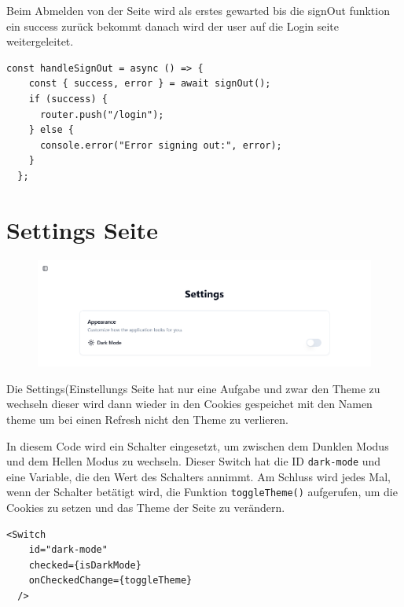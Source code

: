 \begin{inhalt}
\begin{enumerate}[label=\textbf{\arabic*.}]
Beim Abmelden von der Seite wird als erstes  gewarted bis die signOut funktion ein success zurück bekommt danach wird der user auf die Login seite weitergeleitet. 

\begin{lstlisting}[language=mytsx]
  const handleSignOut = async () => {
    const { success, error } = await signOut();
    if (success) {
      router.push("/login");
    } else {
      console.error("Error signing out:", error);
    }
  };
\end{lstlisting}


\newpage

\section{Settings Seite}

\begin{figure}[!htb]
\centering
\includegraphics[width=1\textwidth]{files/Thomas/pics/Website/Settings/settings-screen.png}
\caption[Bildbezeichnung für Abbildungsverzeichnis]{}
\label{fig:gehaeuse_internet_bild}
\end{figure}


Die Settings(Einstellungs Seite hat nur eine Aufgabe und zwar den Theme zu wechseln dieser wird dann wieder in den Cookies gespeichet mit den Namen theme um bei einen Refresh nicht den Theme zu verlieren.

\vspace{2cm}

In diesem Code wird ein Schalter eingesetzt, um zwischen dem Dunklen Modus und dem Hellen Modus zu wechseln. Dieser Switch hat die ID \texttt{dark-mode} und eine Variable, die den Wert des Schalters annimmt. Am Schluss wird jedes Mal, wenn der Schalter betätigt wird, die Funktion \texttt{toggleTheme()} aufgerufen, um die Cookies zu setzen und das Theme der Seite zu verändern.


\begin{lstlisting}[language=mytsx]
<Switch
    id="dark-mode"
    checked={isDarkMode}
    onCheckedChange={toggleTheme}
  />
\end{lstlisting}


\end{enumerate}
\end{inhalt}
